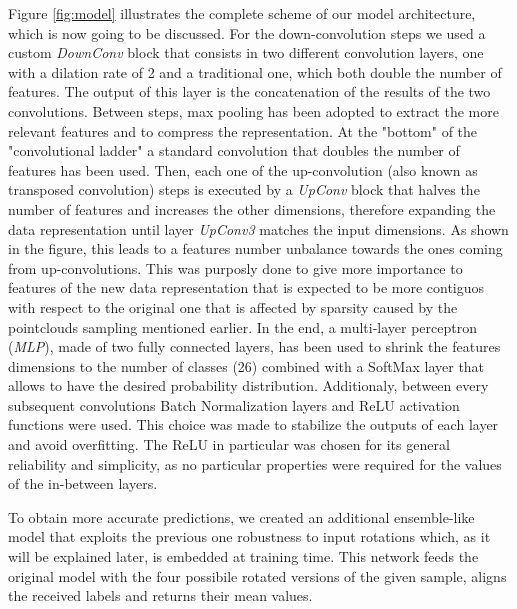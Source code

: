 Figure \ref{fig:model} illustrates the complete scheme of our model architecture, which is now going to be discussed.
For the down-convolution steps we used a custom \textit{DownConv} block that consists in two different
convolution layers, one with a dilation rate of 2 and a traditional one, which both double the number of features. 
The output of this layer is the concatenation of the results of the two convolutions.
Between steps, max pooling has been adopted to extract the more relevant features and to compress the representation.
At the "bottom" of the "convolutional ladder" a standard convolution that doubles the number of features has been used.
Then, each one of the up-convolution (also known as transposed convolution) steps is executed by a \textit{UpConv} block that halves the number of features
and increases the other dimensions, therefore expanding the data representation until layer \textit{UpConv3} matches the input dimensions.
As shown in the figure, this leads to a features number unbalance towards the ones coming from up-convolutions.
This was purposly done to give more importance to features of the new data representation that is expected to be more 
contiguos with respect to the original one that is affected by sparsity caused by the pointclouds sampling mentioned earlier.
In the end, a multi-layer perceptron (\textit{MLP}), made of two fully connected layers, has been used
to shrink the features dimensions to the number of classes (26) combined with a SoftMax layer that allows
to have the desired probability distribution.
Additionaly, between every subsequent convolutions Batch Normalization layers and ReLU activation functions were used.
This choice was made to stabilize the outputs of each layer and avoid overfitting. The ReLU in particular was chosen for
its general reliability and simplicity, as no particular properties were required
for the values of the in-between layers.

To obtain more accurate predictions, we created an additional ensemble-like model that exploits the previous
one robustness to input rotations which, as it will be explained later, is embedded at training time.
This network feeds the original model with the four possibile rotated versions of the given sample, 
aligns the received labels and returns their mean values.
